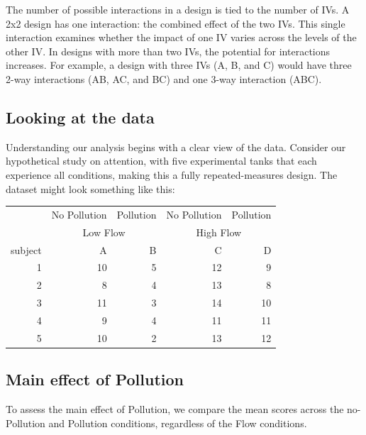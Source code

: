 \documentclass[
  letterpaper,
  DIV=11,
  numbers=noendperiod]{scrreprt}
\begin{document}
The number of possible interactions in a design is tied to the number of
IVs. A 2x2 design has one interaction: the combined effect of the two
IVs. This single interaction examines whether the impact of one IV
varies across the levels of the other IV. In designs with more than two
IVs, the potential for interactions increases. For example, a design
with three IVs (A, B, and C) would have three 2-way interactions (AB,
AC, and BC) and one 3-way interaction (ABC).

\subsection{Looking at the data}\label{looking-at-the-data-1}

Understanding our analysis begins with a clear view of the data.
Consider our hypothetical study on attention, with five experimental
tanks that each experience all conditions, making this a fully
repeated-measures design. The dataset might look something like this:

\begin{table}
\centering
\begin{tabular}{r|r|r|r|r}
\hline
\multicolumn{1}{c|}{ } & \multicolumn{1}{c|}{No Pollution} & \multicolumn{1}{c|}{Pollution} & \multicolumn{1}{c|}{No Pollution} & \multicolumn{1}{c}{Pollution} \\
\cline{2-2} \cline{3-3} \cline{4-4} \cline{5-5}
\multicolumn{1}{c|}{ } & \multicolumn{2}{c|}{Low Flow} & \multicolumn{2}{c}{High Flow} \\
\cline{2-3} \cline{4-5}
subject & A & B & C & D\\
\hline
1 & 10 & 5 & 12 & 9\\
\hline
2 & 8 & 4 & 13 & 8\\
\hline
3 & 11 & 3 & 14 & 10\\
\hline
4 & 9 & 4 & 11 & 11\\
\hline
5 & 10 & 2 & 13 & 12\\
\hline
\end{tabular}
\end{table}

\subsection{Main effect of Pollution}\label{main-effect-of-pollution}

To assess the main effect of Pollution, we compare the mean scores
across the no-Pollution and Pollution conditions, regardless of the Flow
conditions.
\end{document}
